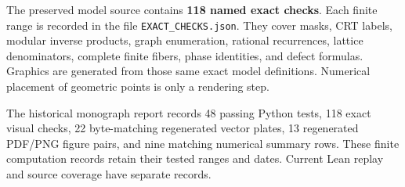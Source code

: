 The preserved model source contains \textbf{118 named exact checks}. Each finite range is recorded in the file \texttt{EXACT\_CHECKS.json}. They cover masks, CRT labels, modular inverse products, graph enumeration, rational recurrences, lattice denominators, complete finite fibers, phase identities, and defect formulas. Graphics are generated from those same exact model definitions. Numerical placement of geometric points is only a rendering step.

The historical monograph report records 48 passing Python tests, 118 exact visual checks, 22 byte-matching regenerated vector plates, 13 regenerated PDF/PNG figure pairs, and nine matching numerical summary rows. These finite computation records retain their tested ranges and dates. Current Lean replay and source coverage have separate records.


